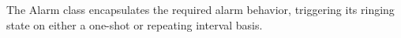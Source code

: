 
The Alarm class encapsulates the required alarm behavior, triggering its
ringing state on either a one-shot or repeating interval basis.
